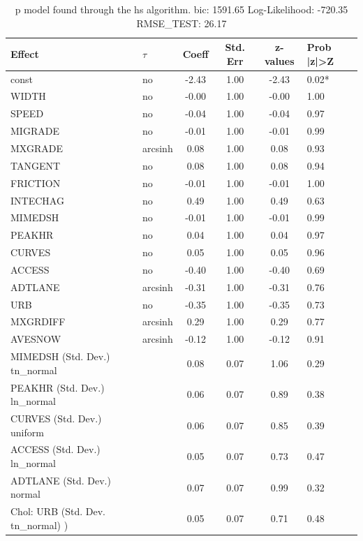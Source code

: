 \begin{table}
	\caption{p model found through the hs algorithm. bic: 1591.65 Log-Likelihood: -720.35 RMSE_TEST: 26.17}
	\begin{center}
		\begin{tabular}{|l|l|c|c|c|l|}
			\hline
			Effect & $\tau$ & Coeff & Std. Err & z-values & Prob |z|>Z \\
			\hline
			const & no & -2.43 & 1.00 & -2.43 & 0.02* \\
			\hline
			WIDTH & no & -0.00 & 1.00 & -0.00 & 1.00 \\
			\hline
			SPEED & no & -0.04 & 1.00 & -0.04 & 0.97 \\
			\hline
			MIGRADE & no & -0.01 & 1.00 & -0.01 & 0.99 \\
			\hline
			MXGRADE & arcsinh & 0.08 & 1.00 & 0.08 & 0.93 \\
			\hline
			TANGENT & no & 0.08 & 1.00 & 0.08 & 0.94 \\
			\hline
			FRICTION & no & -0.01 & 1.00 & -0.01 & 1.00 \\
			\hline
			INTECHAG & no & 0.49 & 1.00 & 0.49 & 0.63 \\
			\hline
			MIMEDSH & no & -0.01 & 1.00 & -0.01 & 0.99 \\
			\hline
			PEAKHR & no & 0.04 & 1.00 & 0.04 & 0.97 \\
			\hline
			CURVES & no & 0.05 & 1.00 & 0.05 & 0.96 \\
			\hline
			ACCESS & no & -0.40 & 1.00 & -0.40 & 0.69 \\
			\hline
			ADTLANE & arcsinh & -0.31 & 1.00 & -0.31 & 0.76 \\
			\hline
			URB & no & -0.35 & 1.00 & -0.35 & 0.73 \\
			\hline
			MXGRDIFF & arcsinh & 0.29 & 1.00 & 0.29 & 0.77 \\
			\hline
			AVESNOW & arcsinh & -0.12 & 1.00 & -0.12 & 0.91 \\
			\hline
			MIMEDSH (Std. Dev.) tn_normal &  & 0.08 & 0.07 & 1.06 & 0.29 \\
			\hline
			PEAKHR (Std. Dev.) ln_normal &  & 0.06 & 0.07 & 0.89 & 0.38 \\
			\hline
			CURVES (Std. Dev.) uniform &  & 0.06 & 0.07 & 0.85 & 0.39 \\
			\hline
			ACCESS (Std. Dev.) ln_normal &  & 0.05 & 0.07 & 0.73 & 0.47 \\
			\hline
			ADTLANE (Std. Dev.) normal &  & 0.07 & 0.07 & 0.99 & 0.32 \\
			\hline
			 Chol: URB (Std. Dev. tn_normal) ) &  & 0.05 & 0.07 & 0.71 & 0.48 \\

\end{tabular}
\end{center}
\end{table}
